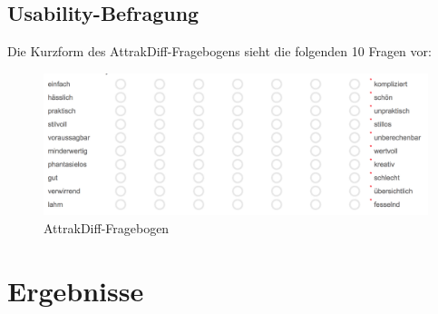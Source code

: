 \subsection{Usability-Befragung} \label{sec:usabilitySurvey}
Die Kurzform des AttrakDiff-Fragebogens sieht die folgenden 10 Fragen vor:
\begin{figure}[H]
 \centering
 \includegraphics[width=1\textwidth]{grafiken/attrak_diff_short.png}
 \caption{AttrakDiff-Fragebogen}
 \label{fig:attrakDiffFragebogen}
\end{figure}
\section{Ergebnisse}
